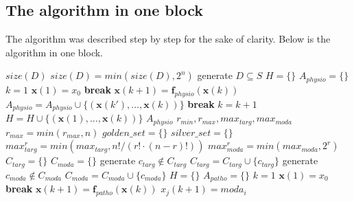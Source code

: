 \documentclass[oneside,a4paper,onecolumn,notitlepage,final]{article}
\begin{document}
\subsection{The algorithm in one block}
The algorithm was described step by step for the sake of clarity. Below is the algorithm in one block.
\begin{algorithmic}[1]
\REQUIRE $size(D)$
\STATE $size(D)=min(size(D),2^n)$
\STATE generate $D\subseteq S$
\STATE $H=\lbrace \rbrace$
\STATE $A_{physio}=\lbrace \rbrace$
    \STATE $k=1$
    \STATE $\boldsymbol{x}(1)=x_0$
            \STATE \textbf{break}
        \ENDIF
        \STATE $\boldsymbol{x}(k+1)=\boldsymbol{f}_{physio}(\boldsymbol{x}(k))$
            \STATE $A_{physio}=A_{physio}\cup \lbrace (\boldsymbol{x}(k'),\dots ,\boldsymbol{x}(k))\rbrace$
            \STATE \textbf{break}
        \ENDIF
        \STATE $k=k+1$
    \ENDWHILE
    \STATE $H=H\cup \lbrace (\boldsymbol{x}(1),\dots ,\boldsymbol{x}(k))\rbrace$
\ENDFOR
\ENSURE $A_{physio}$
\REQUIRE $r_{min},r_{max},max_{targ},max_{moda}$
\STATE $r_{max}=min(r_{max},n)$
\STATE $golden\_set=\lbrace \rbrace$
\STATE $silver\_set=\lbrace \rbrace$
    \STATE $max_{targ}^{r}=min(max_{targ},n!/(r!\cdot (n-r)!))$
    \STATE $max_{moda}^{r}=min(max_{moda},2^{r})$
    \STATE $C_{targ}=\lbrace \rbrace$
    \STATE $C_{moda}=\lbrace \rbrace$
        \STATE generate $c_{targ}\notin C_{targ}$
        \STATE $C_{targ}=C_{targ}\cup \lbrace c_{targ}\rbrace$
    \ENDWHILE
        \STATE generate $c_{moda}\notin C_{moda}$
        \STATE $C_{moda}=C_{moda}\cup \lbrace c_{moda}\rbrace$
    \ENDWHILE
            \STATE $H=\lbrace \rbrace$
            \STATE $A_{patho}=\lbrace \rbrace$
                \STATE $k=1$
                \STATE $\boldsymbol{x}(1)=x_0$
                        \STATE \textbf{break}
                    \ENDIF
                    \STATE $\boldsymbol{x}(k+1)=\boldsymbol{f}_{patho}(\boldsymbol{x}(k))$
                                \STATE $x_j(k+1)=moda_i$

\end{algorithmic}
\end{document}

